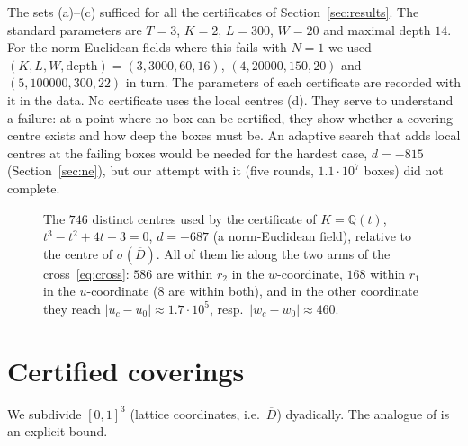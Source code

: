 \documentclass[11pt]{amsart}
\theoremstyle{definition}
\theoremstyle{remark}
\numberwithin{equation}{section}
\newcommand{\Q}{\mathbb{Q}}
\begin{document}
The sets (a)--(c) sufficed for all the certificates of Section~\ref{sec:results}. The standard
parameters are $T=3$, $K=2$, $L=300$, $W=20$ and maximal depth $14$. For the norm-Euclidean
fields where this fails with $N=1$ we used $(K,L,W,\text{depth})=(3,3000,60,16)$,
$(4,20000,150,20)$ and $(5,100000,300,22)$ in turn. The parameters of each certificate are
recorded with it in the data. No certificate uses the local centres (d). They serve to
understand a failure: at a point where no box can be certified, they show whether a covering
centre exists and how deep the boxes must be. An adaptive search that adds local centres at the
failing boxes would be needed for the hardest case, $d=-815$ (Section~\ref{sec:ne}), but our
attempt with it (five rounds, $1.1\cdot10^7$ boxes) did not complete.

\begin{figure}[t]
\centering
{}
\caption{The $746$ distinct centres used by the certificate of $K=\Q(t)$,
$t^3-t^2+4t+3=0$, $d=-687$ (a norm-Euclidean field), relative to the centre of
$\sigma(\overline D)$. All of them lie along the two arms of the cross~\eqref{eq:cross}:
$586$ are within $r_2$ in the $w$-coordinate, $168$ within $r_1$ in the $u$-coordinate ($8$
are within both), and in the other coordinate they reach $|u_c-u_0|\approx1.7\cdot10^5$, resp.\
$|w_c-w_0|\approx460$.}
\label{fig:centres}
\end{figure}

\section{Certified coverings}\label{sec:cert}

We subdivide $[0,1]^3$ (lattice coordinates, i.e.\ $\overline D$) dyadically. The analogue of
\cite[Lemma~3.2]{GM} is an explicit bound.
\end{document}
